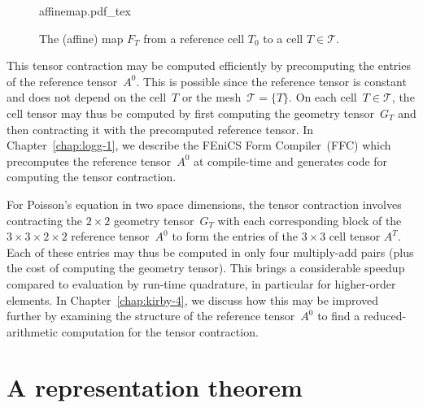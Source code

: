 \begin{figure}
  \begin{center}
    \def\svgwidth{\largefig}
    {affinemap.pdf_tex}
    \caption{The (affine) map $F_T$ from a reference cell $T_0$
      to a cell $T \in \mathcal{T}$.}
    \label{fig:affinemap}
  \end{center}
\end{figure}

This tensor contraction may be computed efficiently by precomputing
the entries of the reference tensor~$A^0$. This is possible since the
reference tensor is constant and does not depend on the cell~$T$ or
the mesh~$\mathcal{T} = \{T\}$. On each cell~$T \in \mathcal{T}$, the
cell tensor may thus be computed by first computing the geometry
tensor~$G_T$ and then contracting it with the precomputed reference
tensor. In Chapter~\ref{chap:logg-1}, we describe the FEniCS Form
Compiler~(FFC) which precomputes the reference tensor~$A^0$ at
compile-time and generates code for computing the tensor contraction.

For Poisson's equation in two space dimensions, the tensor contraction
involves contracting the $2 \times 2$ geometry tensor~$G_T$ with each
corresponding block of the $3 \times 3 \times 2 \times 2$ reference
tensor~$A^0$ to form the entries of the $3 \times 3$ cell tensor
$A^T$. Each of these entries may thus be computed in only four
multiply-add pairs (plus the cost of computing the geometry
tensor). This brings a considerable speedup compared to evaluation by
run-time quadrature, in particular for higher-order elements. In
Chapter~\ref{chap:kirby-4}, we discuss how this may be improved
further by examining the structure of the reference tensor~$A^0$ to
find a reduced-arithmetic computation for the tensor contraction.

\section{A representation theorem}

